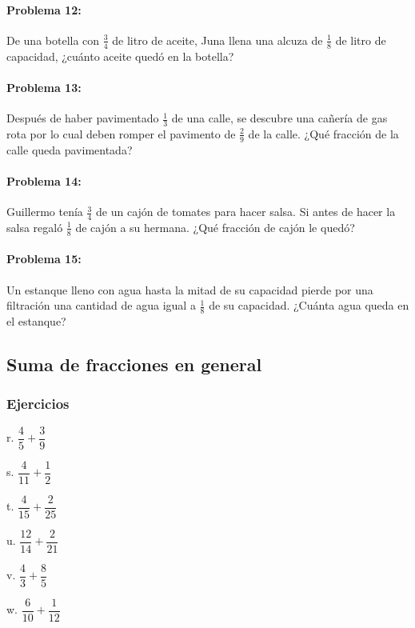 \documentclass[10pt,twoside]{article}
\begin{document}
\paragraph*{Problema 12:} De una botella con $\frac{3}{4}$ de litro de aceite, Juna llena una alcuza de $\frac{1}{8}$ de litro de capacidad, ¿cuánto aceite quedó en la botella?
\paragraph*{Problema 13:} Después de haber pavimentado $\frac{1}{3}$ de una calle, se descubre una cañería de gas rota por lo cual deben romper el pavimento de $\frac{2}{9}$ de la calle. ¿Qué fracción de la calle queda pavimentada?
\paragraph*{Problema 14:} Guillermo tenía $\frac{3}{4}$ de un cajón de tomates para hacer salsa. Si antes de hacer la salsa regaló $\frac{1}{8}$ de cajón a su hermana. ¿Qué fracción de cajón le quedó?
\paragraph*{Problema 15:} Un estanque lleno con agua hasta la mitad de su capacidad pierde por una filtración una cantidad de agua igual a $\frac{1}{8}$ de su capacidad. ¿Cuánta agua queda en el estanque?
\subsection*{Suma de fracciones en general}
\subsubsection*{Ejercicios}
\begin{enumerate}
\begin{multicols}{3}
\item[r.] $\dfrac{4}{5}+\dfrac{3}{9}$
\item[s.] $\dfrac{4}{11}+\dfrac{1}{2}$
\item[t.] $\dfrac{4}{15}+\dfrac{2}{25}$
\item[u.] $\dfrac{12}{14}+\dfrac{2}{21}$
\item[v.] $\dfrac{4}{3}+\dfrac{8}{5}$
\item[w.] $\dfrac{6}{10}+\dfrac{1}{12}$
\end{multicols}
\end{enumerate}
\end{document}
